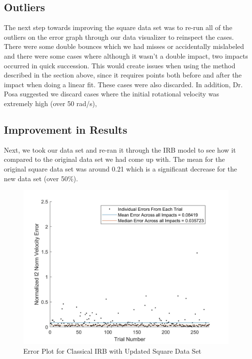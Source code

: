 \documentclass{article}
\begin{document}
\subsection{Outliers}
The next step towards improving the square data set was to re-run all of the outliers  on the error graph through our data visualizer to reinspect the cases. There were some double bounces which we had misses or accidentally mislabeled and there were some cases where although it wasn't a double impact, two impacts occurred in quick succession. This would create issues when using the method described in the section above, since it requires points both before and after the impact when doing a linear fit. These cases were also discarded. In addition, Dr. Posa suggested we discard cases where the initial rotational velocity was extremely high (over 50 rad/s), 

\subsection{Improvement in Results}
Next, we took our data set and re-ran it through the IRB model to see how it compared to the original data set we had come up with. The mean for the original square data set was around 0.21 which is a significant decrease for the new data set (over 50\%). 

 \begin{figure}[h!]
        \centering
        \includegraphics[scale=0.15]{IRBError.jpg}
        \caption{Error Plot for Classical IRB with Updated Square Data Set}
        \label{fig:IRBError}
\end{figure}
\end{document}
